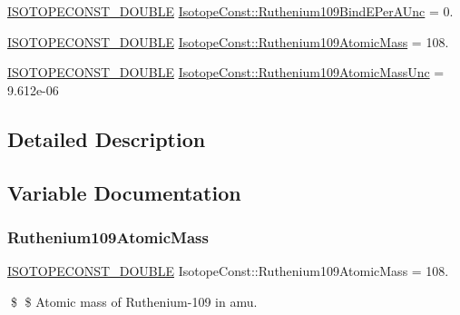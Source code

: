 \begin{DoxyCompactItemize}
\mbox{\hyperlink{group___isotope_const-_macros_ga8f45a7272ce02c0b4c65c44636ed719a}{I\+S\+O\+T\+O\+P\+E\+C\+O\+N\+S\+T\+\_\+\+D\+O\+U\+B\+LE}} \mbox{\hyperlink{group___isotope_const-_ruthenium-_ru109_ga64fc6a000889e80db4a0484ce7ee6136}{Isotope\+Const\+::\+Ruthenium109\+Bind\+E\+Per\+A\+Unc}} = 0.
\item 
\mbox{\hyperlink{group___isotope_const-_macros_ga8f45a7272ce02c0b4c65c44636ed719a}{I\+S\+O\+T\+O\+P\+E\+C\+O\+N\+S\+T\+\_\+\+D\+O\+U\+B\+LE}} \mbox{\hyperlink{group___isotope_const-_ruthenium-_ru109_ga8bd9de685918042e37dba14c9bbe772b}{Isotope\+Const\+::\+Ruthenium109\+Atomic\+Mass}} = 108.
\item 
\mbox{\hyperlink{group___isotope_const-_macros_ga8f45a7272ce02c0b4c65c44636ed719a}{I\+S\+O\+T\+O\+P\+E\+C\+O\+N\+S\+T\+\_\+\+D\+O\+U\+B\+LE}} \mbox{\hyperlink{group___isotope_const-_ruthenium-_ru109_gab84c98fb113da53cf988793f27c128a5}{Isotope\+Const\+::\+Ruthenium109\+Atomic\+Mass\+Unc}} = 9.\+612e-\/06
\end{DoxyCompactItemize}


\subsection{Detailed Description}


\subsection{Variable Documentation}
\mbox{\label{group___isotope_const-_ruthenium-_ru109_ga8bd9de685918042e37dba14c9bbe772b}} 
\subsubsection{\texorpdfstring{Ruthenium109\+Atomic\+Mass}{Ruthenium109AtomicMass}}
{\footnotesize\ttfamily \mbox{\hyperlink{group___isotope_const-_macros_ga8f45a7272ce02c0b4c65c44636ed719a}{I\+S\+O\+T\+O\+P\+E\+C\+O\+N\+S\+T\+\_\+\+D\+O\+U\+B\+LE}} Isotope\+Const\+::\+Ruthenium109\+Atomic\+Mass = 108.}

\$ \$ Atomic mass of Ruthenium-\/109 in amu. \mbox{\label{group___isotope_const-_ruthenium-_ru109_gab84c98fb113da53cf988793f27c128a5}} 
